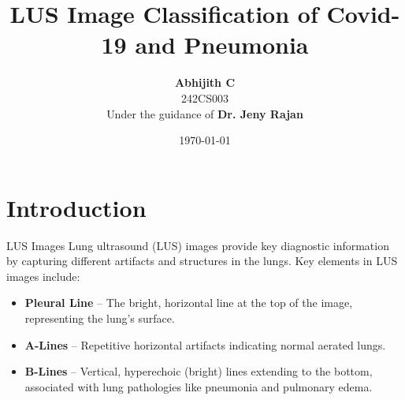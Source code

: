 \documentclass{beamer}
\title{LUS Image Classification of Covid-19 and Pneumonia}
\author{
    \textbf{Abhijith C }\\ %
    242CS003 \\ %
    Under the guidance of \textbf{Dr. Jeny Rajan} \\ %
}
\date{\today}
\begin{document}
\maketitle

\section{Introduction}
\begin{frame}{LUS Images}
        Lung ultrasound (LUS) images provide key diagnostic information by capturing different artifacts and structures in the lungs. Key elements in LUS images include:
\begin{itemize}
        \item \textbf{Pleural Line} – The bright, horizontal line at the top of the image, representing the lung’s surface.
        \item \textbf{A-Lines} – Repetitive horizontal artifacts indicating normal aerated lungs.
        \item \textbf{B-Lines} – Vertical, hyperechoic (bright) lines extending to the bottom, associated with lung pathologies like pneumonia and pulmonary edema.
    \end{itemize}
    
\end{frame}
\end{document}
